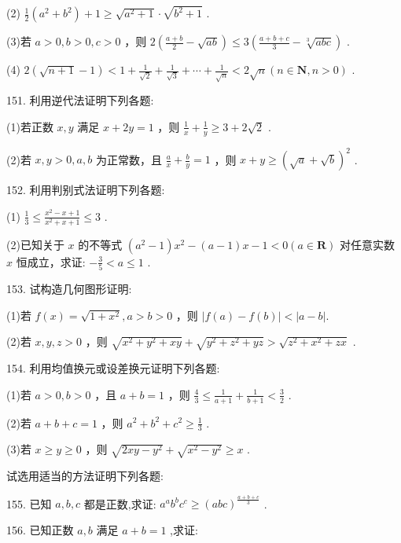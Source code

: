 \documentclass[10pt]{article}
\begin{document}
(2) \(\frac{1}{2}\left( {{a}^{2} + {b}^{2}}\right)  + 1 \geq  \sqrt{{a}^{2} + 1} \cdot  \sqrt{{b}^{2} + 1}\) .

(3)若 \(a > 0,b > 0,c > 0\) ，则 \(2\left( {\frac{a + b}{2} - \sqrt{ab}}\right)  \leq  3\left( {\frac{a + b + c}{3} - \sqrt[3]{abc}}\right)\) .

(4) \(2\left( {\sqrt{n + 1} - 1}\right)  < 1 + \frac{1}{\sqrt{2}} + \frac{1}{\sqrt{3}} + \cdots  + \frac{1}{\sqrt{n}} < 2\sqrt{n}\left( {n \in  \mathbf{N},n > 0}\right)\) .

151. 利用逆代法证明下列各题:

(1)若正数 \(x,y\) 满足 \(x + {2y} = 1\) ，则 \(\frac{1}{x} + \frac{1}{y} \geq  3 + 2\sqrt{2}\) .

(2)若 \(x,y > 0,a,b\) 为正常数，且 \(\frac{a}{x} + \frac{b}{y} = 1\) ，则 \(x + y \geq  {\left( \sqrt{a} + \sqrt{b}\right) }^{2}\) .

152. 利用判别式法证明下列各题:

(1) \(\frac{1}{3} \leq  \frac{{x}^{2} - x + 1}{{x}^{2} + x + 1} \leq  3\) .

(2)已知关于 \(x\) 的不等式 \(\left( {{a}^{2} - 1}\right) {x}^{2} - \left( {a - 1}\right) x - 1 < 0\left( {a \in  \mathbf{R}}\right)\) 对任意实数 \(x\) 恒成立，求证: \(- \frac{3}{5} < a \leq  1\) .

153. 试构造几何图形证明:

(1)若 \(f\left( x\right)  = \sqrt{1 + {x}^{2}},a > b > 0\) ，则 \(\left| {f\left( a\right)  - f\left( b\right) }\right|  < \left| {a - b}\right| .\)

(2)若 \(x,y,z > 0\) ，则 \(\sqrt{{x}^{2} + {y}^{2} + {xy}} + \sqrt{{y}^{2} + {z}^{2} + {yz}} > \sqrt{{z}^{2} + {x}^{2} + {zx}}\) .

154. 利用均值换元或设差换元证明下列各题:

(1)若 \(a > 0,b > 0\) ，且 \(a + b = 1\) ，则 \(\frac{4}{3} \leq  \frac{1}{a + 1} + \frac{1}{b + 1} < \frac{3}{2}\) .

(2)若 \(a + b + c = 1\) ，则 \({a}^{2} + {b}^{2} + {c}^{2} \geq  \frac{1}{3}\) .

(3)若 \(x \geq  y \geq  0\) ，则 \(\sqrt{{2xy} - {y}^{2}} + \sqrt{{x}^{2} - {y}^{2}} \geq  x\) .

试选用适当的方法证明下列各题:

155. 已知 \(a,b,c\) 都是正数,求证: \({a}^{a}{b}^{b}{c}^{c} \geq  {\left( abc\right) }^{\frac{a + b + c}{3}}\) .

156. 已知正数 \(a,b\) 满足 \(a + b = 1\) ,求证:
\end{document}
